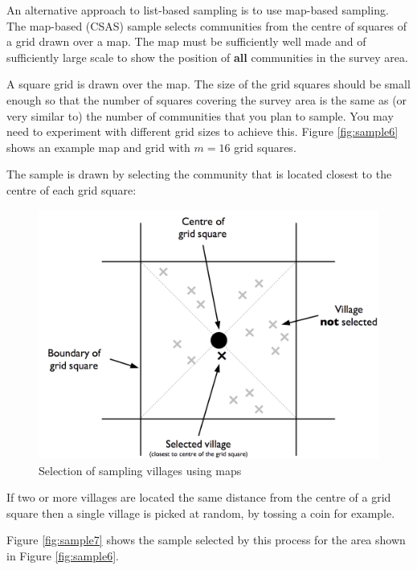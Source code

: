 \documentclass[12pt,a4paper]{book}
\theoremstyle{definition}
\theoremstyle{definition}
\theoremstyle{definition}
\theoremstyle{remark}
\begin{document}
An alternative approach to list-based sampling is to use map-based
sampling. The map-based (CSAS) sample selects communities from the
centre of squares of a grid drawn over a map. The map must be
sufficiently well made and of sufficiently large scale to show the
position of \textbf{all} communities in the survey area.

A square grid is drawn over the map. The size of the grid squares should
be small enough so that the number of squares covering the survey area
is the same as (or very similar to) the number of communities that you
plan to sample. You may need to experiment with different grid sizes to
achieve this. Figure \ref{fig:sample6} shows an example map and grid
with \(m = 16\) grid squares.

The sample is drawn by selecting the community that is located closest
to the centre of each grid square:

\begin{figure}[H]

{\centering \includegraphics[width=800pt]{figures/mapSample1} 

}

\caption{Selection of sampling villages using maps}\label{fig:sample5}
\end{figure}

If two or more villages are located the same distance from the centre of
a grid square then a single village is picked at random, by tossing a
coin for example.

Figure \ref{fig:sample7} shows the sample selected by this process for
the area shown in Figure \ref{fig:sample6}.
\end{document}
